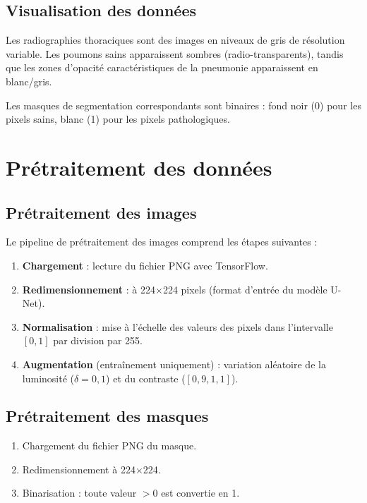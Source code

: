 \documentclass[12pt,a4paper,twoside]{report}
\begin{document}
\subsection{Visualisation des données}

Les radiographies thoraciques sont des images en niveaux de gris de résolution variable. Les poumons sains apparaissent sombres (radio-transparents), tandis que les zones d'opacité caractéristiques de la pneumonie apparaissent en blanc/gris.

Les masques de segmentation correspondants sont binaires : fond noir (0) pour les pixels sains, blanc (1) pour les pixels pathologiques.

\section{Prétraitement des données}

\subsection{Prétraitement des images}

Le pipeline de prétraitement des images comprend les étapes suivantes :

\begin{enumerate}
  \item \textbf{Chargement} : lecture du fichier PNG avec TensorFlow.
  \item \textbf{Redimensionnement} : à 224$\times$224 pixels (format d'entrée du modèle U-Net).
  \item \textbf{Normalisation} : mise à l'échelle des valeurs des pixels dans l'intervalle $[0, 1]$ par division par 255.
  \item \textbf{Augmentation} (entraînement uniquement) : variation aléatoire de la luminosité ($\delta = 0,1$) et du contraste ($[0,9, 1,1]$).
\end{enumerate}

\subsection{Prétraitement des masques}

\begin{enumerate}
  \item Chargement du fichier PNG du masque.
  \item Redimensionnement à 224$\times$224.
  \item Binarisation : toute valeur $>0$ est convertie en 1.
\end{enumerate}
\end{document}
